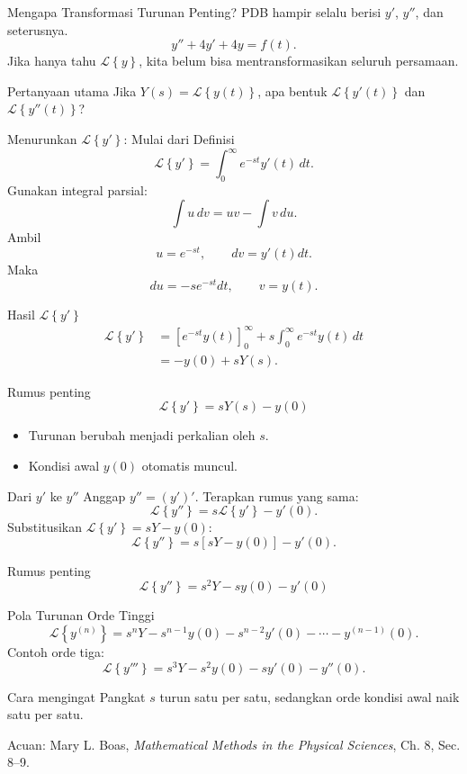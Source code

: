 \documentclass[aspectratio=169,10pt]{beamer}
\newcommand{\Lcal}{\mathcal{L}}
\newcommand{\Lap}[1]{\Lcal\left\{#1\right\}}
\newcommand{\boasnote}{\scriptsize\color{iteraGray}Acuan: Mary L. Boas, \textit{Mathematical Methods in the Physical Sciences}, Ch. 8, Sec. 8--9.}
\begin{document}
\begin{frame}{Mengapa Transformasi Turunan Penting?}
PDB hampir selalu berisi $y'$, $y''$, dan seterusnya.
\[
y''+4y'+4y=f(t).
\]
Jika hanya tahu $\Lap{y}$, kita belum bisa mentransformasikan seluruh persamaan.
\vspace{2mm}
\begin{block}{Pertanyaan utama}
Jika $Y(s)=\Lap{y(t)}$, apa bentuk $\Lap{y'(t)}$ dan $\Lap{y''(t)}$?
\end{block}
\end{frame}

\begin{frame}{Menurunkan $\Lap{y'}$: Mulai dari Definisi}
\[
\Lap{y'}=\int_0^\infty e^{-st}y'(t)\,dt.
\]
Gunakan integral parsial:
\[
\int u\,dv=uv-\int v\,du.
\]
Ambil
\[
u=e^{-st},\qquad dv=y'(t)dt.
\]
Maka
\[
du=-se^{-st}dt,\qquad v=y(t).
\]
\end{frame}

\begin{frame}{Hasil $\Lap{y'}$}
\begin{align*}
\Lap{y'}
&=\left[e^{-st}y(t)\right]_0^\infty
+s\int_0^\infty e^{-st}y(t)\,dt\\
&=-y(0)+sY(s).
\end{align*}
\begin{alertblock}{Rumus penting}
\[
\boxed{\Lap{y'}=sY(s)-y(0)}
\]
\end{alertblock}
\begin{itemize}
\item Turunan berubah menjadi perkalian oleh $s$.
\item Kondisi awal $y(0)$ otomatis muncul.
\end{itemize}
\end{frame}

\begin{frame}{Dari $y'$ ke $y''$}
Anggap $y''=(y')'$. Terapkan rumus yang sama:
\[
\Lap{y''}=s\Lap{y'}-y'(0).
\]
Substitusikan $\Lap{y'}=sY-y(0)$:
\[
\Lap{y''}=s[sY-y(0)]-y'(0).
\]
\begin{alertblock}{Rumus penting}
\[
\boxed{\Lap{y''}=s^2Y-sy(0)-y'(0)}
\]
\end{alertblock}
\end{frame}

\begin{frame}{Pola Turunan Orde Tinggi}
\small
\[
\Lap{y^{(n)}}=s^nY-s^{n-1}y(0)-s^{n-2}y'(0)-\cdots-y^{(n-1)}(0).
\]
Contoh orde tiga:
\[
\Lap{y'''}=s^3Y-s^2y(0)-sy'(0)-y''(0).
\]
\begin{block}{Cara mengingat}
Pangkat $s$ turun satu per satu, sedangkan orde kondisi awal naik satu per satu.
\end{block}
\vfill
\boasnote
\end{frame}
\end{document}
